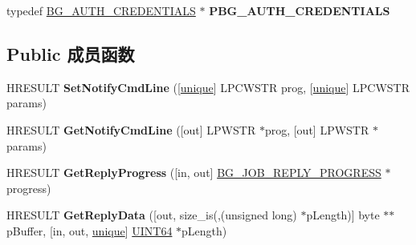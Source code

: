 \begin{DoxyCompactItemize}
\begin{tabbing}
\end{tabbing}\item 
\mbox{\label{interface_i_background_copy_job2_a5c1dd46a95729052957a95f97919f1f5}} 
typedef \hyperlink{struct_i_background_copy_job2_1_1_b_g___a_u_t_h___c_r_e_d_e_n_t_i_a_l_s}{B\+G\+\_\+\+A\+U\+T\+H\+\_\+\+C\+R\+E\+D\+E\+N\+T\+I\+A\+LS} $\ast$ {\bfseries P\+B\+G\+\_\+\+A\+U\+T\+H\+\_\+\+C\+R\+E\+D\+E\+N\+T\+I\+A\+LS}
\end{DoxyCompactItemize}
\subsection*{Public 成员函数}
\begin{DoxyCompactItemize}
\item 
\mbox{\label{interface_i_background_copy_job2_a2fdf133e79b7a8eaa4011d09465236d7}} 
H\+R\+E\+S\+U\+LT {\bfseries Set\+Notify\+Cmd\+Line} (\mbox{[}\hyperlink{interfaceunique}{unique}\mbox{]} L\+P\+C\+W\+S\+TR prog, \mbox{[}\hyperlink{interfaceunique}{unique}\mbox{]} L\+P\+C\+W\+S\+TR params)
\item 
\mbox{\label{interface_i_background_copy_job2_a8629db8629db9a3ad35c213aa7e6bd0a}} 
H\+R\+E\+S\+U\+LT {\bfseries Get\+Notify\+Cmd\+Line} (\mbox{[}out\mbox{]} L\+P\+W\+S\+TR $\ast$prog, \mbox{[}out\mbox{]} L\+P\+W\+S\+TR $\ast$params)
\item 
\mbox{\label{interface_i_background_copy_job2_a9f9eb9339753fdcdbf6cd16c7fac7cb6}} 
H\+R\+E\+S\+U\+LT {\bfseries Get\+Reply\+Progress} (\mbox{[}in, out\mbox{]} \hyperlink{struct_i_background_copy_job2_1_1___b_g___j_o_b___r_e_p_l_y___p_r_o_g_r_e_s_s}{B\+G\+\_\+\+J\+O\+B\+\_\+\+R\+E\+P\+L\+Y\+\_\+\+P\+R\+O\+G\+R\+E\+SS} $\ast$progress)
\item 
\mbox{\label{interface_i_background_copy_job2_af23ce6e2a85332655504a5bb8d6115c2}} 
H\+R\+E\+S\+U\+LT {\bfseries Get\+Reply\+Data} (\mbox{[}out, size\+\_\+is(,(unsigned long) $\ast$p\+Length)\mbox{]} byte $\ast$$\ast$p\+Buffer, \mbox{[}in, out, \hyperlink{interfaceunique}{unique}\mbox{]} \hyperlink{_processor_bind_8h_a57be03562867144161c1bfee95ca8f7c}{U\+I\+N\+T64} $\ast$p\+Length)
\item 
$$
\end{DoxyCompactItemize}
